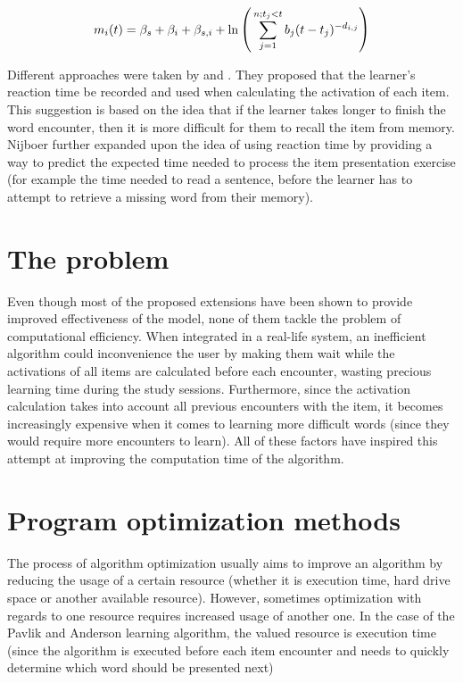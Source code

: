 \documentclass[a4paper]{report}
\begin{document}
\begin{equation}
\begin{large}
\label{eq:activation_ex}
m_i(t) = \beta_s + \beta_i + \beta_{s,i} + \ln{\Bigg(\sum_{j=1}^{n;t_j<t}{b_j(t - t_j)^{-d_{i,j}}}\Bigg)}
\end{large}
\end{equation}

Different approaches were taken by \cite{vans09} and \cite{nijboer11}. They proposed that the learner's reaction time be recorded and used when calculating the activation of each item. This suggestion is based on the idea that if the learner takes longer to finish the word encounter, then it is more difficult for them to recall the item from memory. Nijboer further expanded upon the idea of using reaction time by providing a way to predict the expected time needed to process the item presentation exercise (for example the time needed to read a sentence, before the learner has to attempt to retrieve a missing word from their memory).

\section{The problem}
Even though most of the proposed extensions have been shown to provide improved effectiveness of the model, none of them tackle the problem of computational efficiency. When integrated in a real-life system, an inefficient algorithm could inconvenience the user by making them wait while the activations of all items are calculated before each encounter, wasting precious learning time during the study sessions. Furthermore, since the activation calculation takes into account all previous encounters with the item, it becomes increasingly expensive when it comes to learning more difficult words (since they would require more encounters to learn). All of these factors have inspired this attempt at improving the computation time of the algorithm.

\section{Program optimization methods}
The process of algorithm optimization usually aims to improve an algorithm by reducing the usage of a certain resource (whether it is execution time, hard drive space or another available resource). However, sometimes optimization with regards to one resource requires increased usage of another one. In the case of the Pavlik and Anderson learning algorithm, the valued resource is execution time (since the algorithm is executed before each item encounter and needs to quickly determine which word should be presented next)
\end{document}
